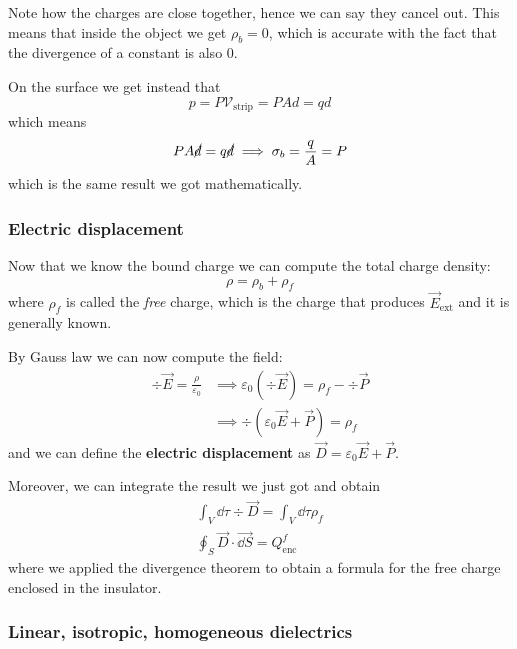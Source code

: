 \documentclass[12pt]{extarticle}
\begin{document}
Note how the charges are close together, hence we can say they cancel out.
This means that inside the object we get $\rho_b = 0$, which is accurate with the fact that the divergence of a constant is also $0$.

On the surface we get instead that
\begin{equation}
	p = P \mathcal V_\text{strip} = P A d = qd
\end{equation}
which means
\begin{equation}
	P A \cancel d = q \cancel d \implies \sigma_b = \frac{q}{A} = P
\end{equation}
which is the same result we got mathematically.

\subsubsection{Electric displacement}

Now that we know the bound charge we can compute the total charge density:
\begin{equation}
	\rho = \rho_b + \rho_f
\end{equation}
where $\rho_f$ is called the \emph{free} charge,
which is the charge that produces $\vec E_\text{ext}$
and it is generally known.

By Gauss law we can now compute the field:
\begin{align}
	\div \vec E = \frac{\rho}{\varepsilon_0} & \implies \varepsilon_0 (\div \vec E) = \rho_f - \div \vec P \\
	                                         & \implies \div (\varepsilon_0 \vec E + \vec P) = \rho_f
\end{align}
and we can define the \textbf{electric displacement} as $\vec D = \varepsilon_0 \vec E + \vec P$.

Moreover, we can integrate the result we just got and obtain
\begin{gather}
	\int_V \dd \tau \div \vec D = \int_V \dd \tau \rho_f \\
	\oint_S \vec D \cdot \vec{\dd S} = Q_\text{enc}^f
\end{gather}
where we applied the divergence theorem to obtain a formula for the free charge enclosed in the insulator.

\subsubsection{Linear, isotropic, homogeneous dielectrics}
\end{document}
